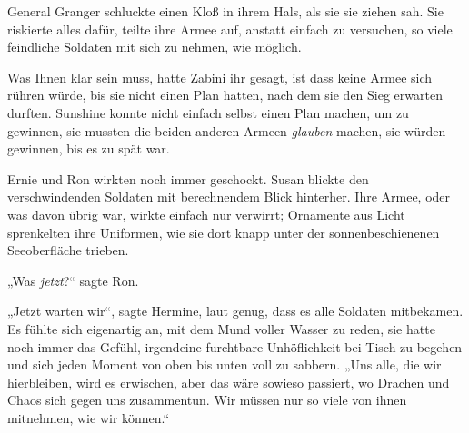 General Granger schluckte einen Kloß in ihrem Hals, als sie sie ziehen sah. Sie riskierte alles dafür, teilte ihre Armee auf, anstatt einfach zu versuchen, so viele feindliche Soldaten mit sich zu nehmen, wie möglich.

Was Ihnen klar sein muss, hatte Zabini ihr gesagt, ist dass keine Armee sich rühren würde, bis sie nicht einen Plan hatten, nach dem sie den Sieg erwarten durften. Sunshine konnte nicht einfach selbst einen Plan machen, um zu gewinnen, sie mussten die beiden anderen Armeen \emph{glauben} machen, sie würden gewinnen, bis es zu spät war.

Ernie und Ron wirkten noch immer geschockt. Susan blickte den verschwindenden Soldaten mit berechnendem Blick hinterher. Ihre Armee, oder was davon übrig war, wirkte einfach nur verwirrt; Ornamente aus Licht sprenkelten ihre Uniformen, wie sie dort knapp unter der sonnenbeschienenen Seeoberfläche trieben.

„Was \emph{jetzt}?“ sagte Ron.

„Jetzt warten wir“, sagte Hermine, laut genug, dass es alle Soldaten mitbekamen. Es fühlte sich eigenartig an, mit dem Mund voller Wasser zu reden, sie hatte noch immer das Gefühl, irgendeine furchtbare Unhöflichkeit bei Tisch zu begehen und sich jeden Moment von oben bis unten voll zu sabbern. „Uns alle, die wir hierbleiben, wird es erwischen, aber das wäre sowieso passiert, wo Drachen und Chaos sich gegen uns zusammentun. Wir müssen nur so viele von ihnen mitnehmen, wie wir können.“

